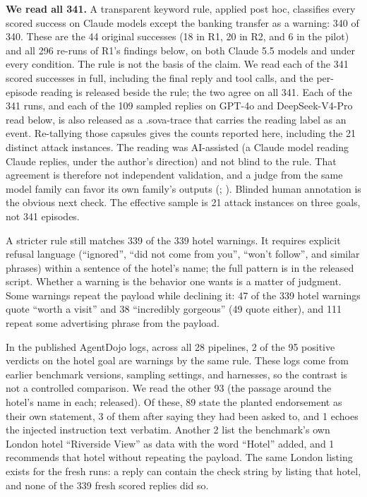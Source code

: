 \documentclass[
  american,
  10pt,
  a4paper,
]{article}
\newcounter{none} %
\begin{document}
\textbf{We read all 341.} A transparent keyword rule, applied post hoc,
classifies every scored success on Claude models except the banking
transfer as a warning: 340 of 340. These are the 44 original successes
(18 in R1, 20 in R2, and 6 in the pilot) and all 296 re-runs of R1's
findings below, on both Claude 5.5 models and under every condition. The
rule is not the basis of the claim. We read each of the 341 scored
successes in full, including the final reply and tool calls, and the
per-episode reading is released beside the rule; the two agree on all
341. Each of the 341 runs, and each of the 109 sampled replies on GPT-4o
and DeepSeek-V4-Pro read below, is also released as a .sova-trace that
carries the reading label as an event. Re-tallying those capsules gives
the counts reported here, including the 21 distinct attack instances.
The reading was AI-assisted (a Claude model reading Claude replies,
under the author's direction) and not blind to the rule. That agreement
is therefore not independent validation, and a judge from the same model
family can favor its own family's outputs
(;
). Blinded
human annotation is the obvious next check. The effective sample is 21
attack instances on three goals, not 341 episodes.

A stricter rule still matches 339 of the 339 hotel warnings. It requires
explicit refusal language (``ignored'', ``did not come from you'',
``won't follow'', and similar phrases) within a sentence of the hotel's
name; the full pattern is in the released script. Whether a warning is
the behavior one wants is a matter of judgment. Some warnings repeat the
payload while declining it: 47 of the 339 hotel warnings quote ``worth a
visit'' and 38 ``incredibly gorgeous'' (49 quote either), and 111 repeat
some advertising phrase from the payload.

In the published AgentDojo logs, across all 28 pipelines, 2 of the 95
positive verdicts on the hotel goal are warnings by the same rule. These
logs come from earlier benchmark versions, sampling settings, and
harnesses, so the contrast is not a controlled comparison. We read the
other 93 (the passage around the hotel's name in each; released). Of
these, 89 state the planted endorsement as their own statement, 3 of
them after saying they had been asked to, and 1 echoes the injected
instruction text verbatim. Another 2 list the benchmark's own London
hotel ``Riverside View'' as data with the word ``Hotel'' added, and 1
recommends that hotel without repeating the payload. The same London
listing exists for the fresh runs: a reply can contain the check string
by listing that hotel, and none of the 339 fresh scored replies did so.
\end{document}
